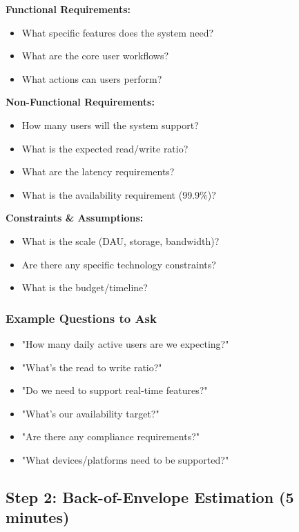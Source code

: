 \documentclass[10pt,a4paper]{article}
\begin{document}
\begin{frameworkbox}
\textbf{Functional Requirements:}
\begin{itemize}
\item What specific features does the system need?
\item What are the core user workflows?
\item What actions can users perform?
\end{itemize}

\textbf{Non-Functional Requirements:}
\begin{itemize}
\item How many users will the system support?
\item What is the expected read/write ratio?
\item What are the latency requirements?
\item What is the availability requirement (99.9\%)?
\end{itemize}

\textbf{Constraints \& Assumptions:}
\begin{itemize}
\item What is the scale (DAU, storage, bandwidth)?
\item Are there any specific technology constraints?
\item What is the budget/timeline?
\end{itemize}
\end{frameworkbox}

\subsubsection{Example Questions to Ask}
\begin{itemize}
\item "How many daily active users are we expecting?"
\item "What's the read to write ratio?"
\item "Do we need to support real-time features?"
\item "What's our availability target?"
\item "Are there any compliance requirements?"
\item "What devices/platforms need to be supported?"
\end{itemize}

\subsection{Step 2: Back-of-Envelope Estimation (5 minutes)}
\end{document}
